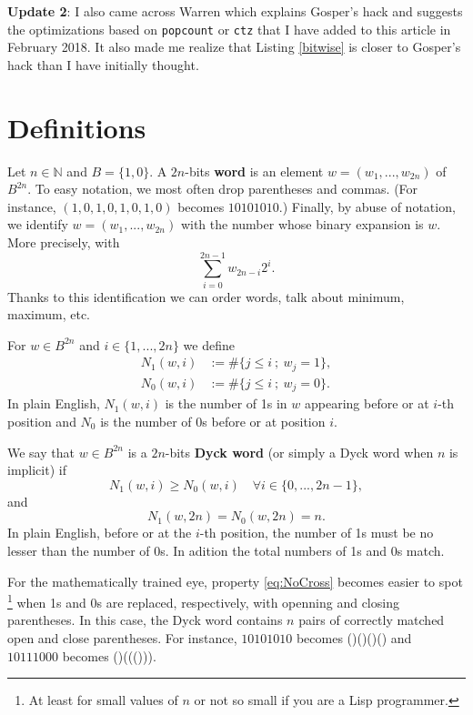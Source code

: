 \documentclass[a4paper]{article}
\begin{document}
{\bf Update 2}: I also came across Warren \cite{Warren} which explains Gosper's hack and suggests the optimizations based on \verb!popcount! or \verb!ctz! that I have added to this article in February 2018.
It also made me realize that Listing \ref{bitwise} is closer to Gosper's hack than I have initially thought.



\section{Definitions}

Let $n\in\mathbb{N}$ and $B = \{1, 0\}$.
A $2n$-bits {\bf word} is an element $w = (w_1, ..., w_{2n})$ of $B^{2n}$.
To easy notation, we most often drop parentheses and commas.
(For instance, $(1, 0, 1, 0, 1, 0, 1, 0)$ becomes $10101010$.)
Finally, by abuse of notation, we identify $w = (w_1, ..., w_{2n})$ with the number whose binary expansion is $w$. More precisely, with
\[
\sum_{i = 0}^{2n - 1} w_{2n - i} 2^i.
\]
Thanks to this identification we can order words, talk about minimum, maximum, etc.

For $w\in B^{2n}$ and $i\in\{1, ..., 2n\}$ we define
\begin{align*}
N_1(w, i) & := \#\{ j \le i\ ;\ w_j = 1 \}, \\
N_0(w, i) & := \#\{ j \le i\ ;\ w_j = 0 \}.
\end{align*}
In plain English, $N_1(w, i)$ is the number of 1s in $w$ appearing before or at $i$-th position
and $N_0$ is the number of 0s before or at position $i$.

We say that $w\in B^{2n}$ is a $2n$-bits {\bf Dyck word} (or simply a Dyck word when $n$ is implicit) if
\begin{equation}
\label{eq:NoCross}
N_1(w, i) \ge N_0(w, i) \quad \forall i\in\{0, ..., 2n - 1\},
\end{equation}
and
\begin{equation}
\label{eq:Path}
N_1(w, 2n) = N_0(w, 2n) = n.
\end{equation}
In plain English, before or at the $i$-th position, the number of 1s must be no lesser than the number
of 0s.
In adition the total numbers of 1s and 0s match.

For the mathematically trained eye, property \eqref{eq:NoCross} becomes easier to spot%
\footnote{At least for small values of $n$ or not so small if you are a Lisp programmer.}
when 1s and 0s are replaced, respectively, with openning and closing parentheses.
In this case, the Dyck word contains $n$ pairs of correctly matched open and close parentheses.
For instance, $10101010$ becomes ()()()() and $10111000$ becomes ()((())).
\end{document}
